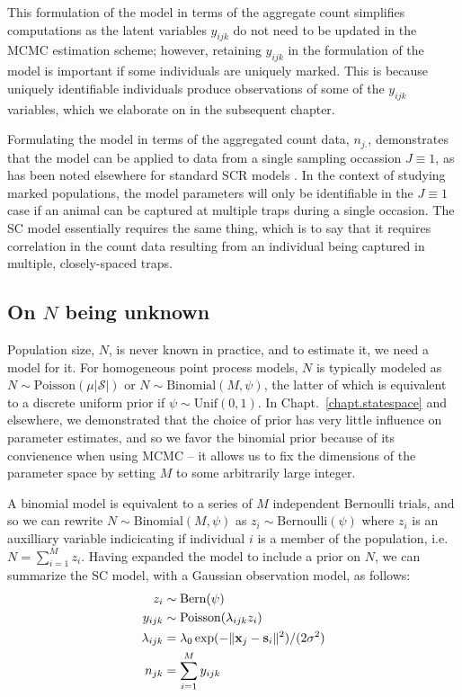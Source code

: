 This formulation of the model in terms of the aggregate count
simplifies computations as the latent variables
$y_{ijk}$ do not need to be updated in the MCMC estimation
scheme; however, retaining $y_{ijk}$ in the formulation of the model
is important if some individuals are uniquely marked. %
This is because
uniquely identifiable individuals produce
observations of some of the $y_{ijk}$ variables, which we elaborate
on in the subsequent chapter.

Formulating the model in terms of the aggregated count data, $n_{j.}$,
demonstrates that the model can be
applied to data from a single sampling occassion $J \equiv 1$, as has
been noted elsewhere for standard SCR models
\citep{efford_etal:2009ecol}. In the context of studying marked
populations, the model parameters will only be identifiable in the
$J\equiv 1$ case if an animal can be captured at multiple traps during
a single occasion. The SC model essentially requires the same thing,
which is to say that it requires correlation in the count data
resulting from an individual being captured in multiple,
closely-spaced traps.


\subsection{On $N$ being unknown}
\label{chapt.unmarked.sec.N}

Population size, $N$, is never known in practice, and to estimate it,
we need a model for it. For homogeneous point process models,
$N$ is typically modeled as
$N \sim \text{Poisson}(\mu|\mathcal{S}|)$ or
$N \sim \text{Binomial}(M, \psi)$, the latter of which is equivalent
to a discrete uniform prior if $\psi \sim \text{Unif}(0,1)$. In
Chapt.~\ref{chapt.statespace} and elsewhere, we demonstrated that
the choice of prior has very little influence on parameter estimates,
and so we favor the binomial prior because of its convienence when
using MCMC -- it allows us to fix the
dimensions of the parameter space by setting $M$ to some arbitrarily
large integer.

A binomial model is
equivalent to a series of $M$ independent Bernoulli trials, and so
we can rewrite $N \sim \text{Binomial}(M, \psi)$ as $z_i \sim
\text{Bernoulli}(\psi)$ where $z_i$ is an auxilliary variable
indicicating if individual $i$ is a member of the population, i.e. $N =
\sum_{i=1}^M z_i$. Having expanded the model to include a prior on $N$, we
can summarize the SC model, with a Gaussian observation model, as follows:
\begin{align*}
  z_i &\sim \text{Bern}(\psi) \\
  y_{ijk} &\sim \text{Poisson}(\lambda_{ijk} z_i) \\
  \lambda_{ijk} &= \lambda_0\exp(-\|{\bf x}_j - {\bf s}_i\|^2)/(2\sigma^2) \\
  n_{jk} &= \sum_{i=1}^M y_{ijk} %
\end{align*}

